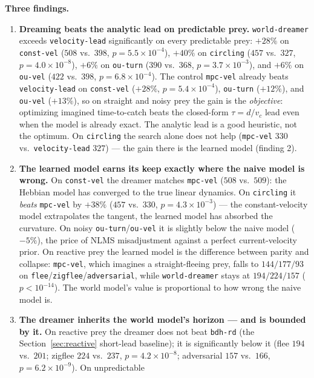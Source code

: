 \documentclass[11pt]{article}
\begin{document}
\textbf{Three findings.}

\begin{enumerate}
\item \textbf{Dreaming beats the analytic lead on predictable prey.} \texttt{world-dreamer} exceeds
  \texttt{velocity-lead} significantly on every predictable prey: $+28\%$ on \texttt{const-vel}
  ($508$ vs.\ $398$, $p = 5.5\times10^{-4}$), $+40\%$ on \texttt{circling} ($457$ vs.\ $327$,
  $p = 4.0\times10^{-8}$), $+6\%$ on \texttt{ou-turn} ($390$ vs.\ $368$,
  $p = 3.7\times10^{-3}$), and $+6\%$ on \texttt{ou-vel} ($422$ vs.\ $398$,
  $p = 6.8\times10^{-4}$). The control \texttt{mpc-vel} already beats \texttt{velocity-lead} on
  \texttt{const-vel} ($+28\%$, $p = 5.4\times10^{-4}$), \texttt{ou-turn} ($+12\%$), and
  \texttt{ou-vel} ($+13\%$), so on straight and noisy prey the gain is the \emph{objective}:
  optimizing imagined time-to-catch beats the closed-form $\tau = d/v_c$ lead even when the model is
  already exact. The analytic lead is a good heuristic, not the optimum. On \texttt{circling} the
  search alone does not help (\texttt{mpc-vel} $330$ vs.\ \texttt{velocity-lead} $327$) --- the gain
  there is the learned model (finding 2).
\item \textbf{The learned model earns its keep exactly where the naive model is wrong.} On
  \texttt{const-vel} the dreamer matches \texttt{mpc-vel} ($508$ vs.\ $509$): the Hebbian model has
  converged to the true linear dynamics. On \texttt{circling} it \emph{beats} \texttt{mpc-vel} by
  $+38\%$ ($457$ vs.\ $330$, $p = 4.3\times10^{-3}$) --- the constant-velocity model extrapolates the
  tangent, the learned model has absorbed the curvature. On noisy \texttt{ou-turn}/\texttt{ou-vel} it
  is slightly below the naive model ($-5\%$), the price of NLMS misadjustment against a perfect
  current-velocity prior. On reactive prey the learned model is the difference between parity and
  collapse: \texttt{mpc-vel}, which imagines a straight-fleeing prey, falls to $144/177/93$ on
  \texttt{flee}/\texttt{zigflee}/\texttt{adversarial}, while \texttt{world-dreamer} stays at
  $194/224/157$ ($p < 10^{-14}$). The world model's value is proportional to how wrong the naive
  model is.
\item \textbf{The dreamer inherits the world model's horizon --- and is bounded by it.} On reactive
  prey the dreamer does not beat \texttt{bdh-rd} (the Section~\ref{sec:reactive} short-lead
  baseline); it is significantly below it (flee $194$ vs.\ $201$; zigflee $224$ vs.\ $237$,
  $p = 4.2\times10^{-8}$; adversarial $157$ vs.\ $166$, $p = 6.2\times10^{-9}$). On unpredictable

\end{enumerate}
\end{document}
